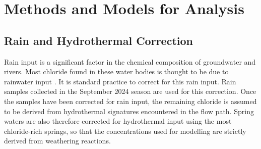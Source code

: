 



\newpage

\section{Methods and Models for Analysis}


\subsection{Rain and Hydrothermal Correction}

Rain input is a significant factor in the chemical composition of groundwater and rivers. Most chloride found in these water bodies is thought to be due to rainwater input \parencite{dreverGeochemistryNaturalWaters1997}. It is standard practice to correct for this rain input. Rain samples collected in the September 2024 season are used for this correction. Once the samples have been corrected for rain input, the remaining chloride is assumed to be derived from hydrothermal signatures encountered in the flow path. Spring waters are also therefore corrected for hydrothermal input using the most chloride-rich springs, so that the concentrations used for modelling are strictly derived from weathering reactions.


